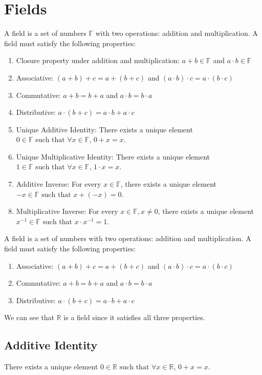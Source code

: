 \documentclass{article}
\begin{document}
\section{Fields}
\begin{axiom}
    A field is a set of numbers $\mathbb{F}$ with two operations: addition and multiplication. A field must satisfy the following properties:
    \begin{enumerate}
        \item Closure property under addition and multiplication: $a + b \in \mathbb{F}$ and $a \cdot b \in \mathbb{F}$
        \item Associative: $(a + b) + c = a + (b + c)$ and $(a \cdot b) \cdot c = a \cdot (b \cdot c)$
        \item Commutative: $a + b = b + a$ and $a \cdot b = b \cdot a$
        \item Distributive: $a \cdot (b + c) = a \cdot b + a \cdot c$
        \item Unique Additive Identity: There exists a unique element $0 \in \mathbb{F} \text{  such that } \forall x \in \mathbb{F}$, $0 + x = x$.
        \item Unique Multiplicative Identity: There exists a unique element $1 \in \mathbb{F} \text{  such that } \forall x \in \mathbb{F}$, $1 \cdot x = x$.
        \item Additive Inverse: For every $x \in \mathbb{F}$, there exists a unique element $-x \in \mathbb{F} \text{  such that } x + (-x) = 0$.
        \item Multiplicative Inverse: For every $x \in \mathbb{F}, x \not = 0$, there exists a unique element $x^{-1} \in \mathbb{F} \text{  such that } x \cdot x^{-1} = 1$.
    \end{enumerate}
\end{axiom}
A field is a set of numbers with two operations: addition and multiplication. A field must satisfy the following properties:
\begin{enumerate}
    \item Associative: $(a + b) + c = a + (b + c)$ and $(a \cdot b) \cdot c = a \cdot (b \cdot c)$
    \item Commutative: $a + b = b + a$ and $a \cdot b = b \cdot a$
    \item Distributive: $a \cdot (b + c) = a \cdot b + a \cdot c$
\end{enumerate}
We can see that $\mathbb{R}$ is a field since it satisfies all three properties. 

\subsection{Additive Identity}
There exists a unique element $0 \in \mathbb{R} \text{  such that } \forall x \in \mathbb{R}$, $0 + x = x$. 
\end{document}
